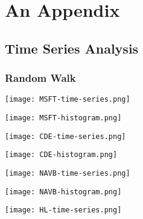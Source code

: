 \chapter{An Appendix}

\section{Time Series Analysis}

\subsection{Random Walk}

\begin{center}
    \texttt{[image: MSFT-time-series.png]}
    \label{fig:nonfloat}
\end{center}

\begin{center}
    \texttt{[image: MSFT-histogram.png]}
    \label{fig:nonfloat}
\end{center}

\begin{center}  
    \texttt{[image: CDE-time-series.png]}
    \label{fig:nonfloat}
\end{center}

\begin{center}  
    \texttt{[image: CDE-histogram.png]}
    \label{fig:nonfloat}
\end{center}

\begin{center}
    \texttt{[image: NAVB-time-series.png]}
    \label{fig:nonfloat}
\end{center}

\begin{center}
    \texttt{[image: NAVB-histogram.png]}
    \label{fig:nonfloat}
\end{center}

\begin{center}
    \texttt{[image: HL-time-series.png]}
    \label{fig:nonfloat}
\end{center}

